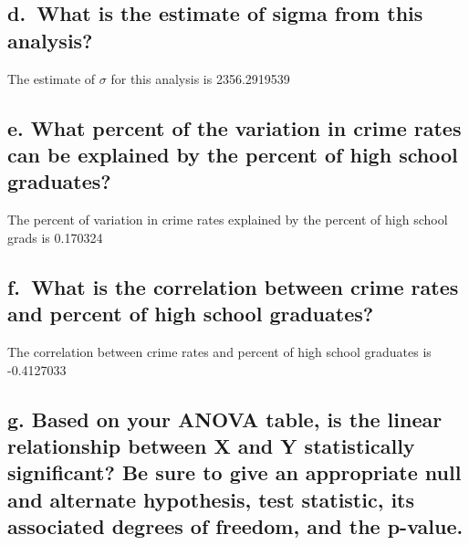 \documentclass[
]{article}
\begin{document}
\hypertarget{d.-what-is-the-estimate-of-sigma-from-this-analysis}{%
\subsection{d.~What is the estimate of sigma from this
analysis?}\label{d.-what-is-the-estimate-of-sigma-from-this-analysis}}

The estimate of \(\sigma\) for this analysis is 2356.2919539

\hypertarget{e.-what-percent-of-the-variation-in-crime-rates-can-be-explained-by-the-percent-of-high-school-graduates}{%
\subsection{e. What percent of the variation in crime rates can be
explained by the percent of high school
graduates?}\label{e.-what-percent-of-the-variation-in-crime-rates-can-be-explained-by-the-percent-of-high-school-graduates}}

The percent of variation in crime rates explained by the percent of high
school grads is 0.170324

\hypertarget{f.-what-is-the-correlation-between-crime-rates-and-percent-of-high-school-graduates}{%
\subsection{f.~What is the correlation between crime rates and percent
of high school
graduates?}\label{f.-what-is-the-correlation-between-crime-rates-and-percent-of-high-school-graduates}}

The correlation between crime rates and percent of high school graduates
is -0.4127033

\hypertarget{g.-based-on-your-anova-table-is-the-linear-relationship-between-x-and-y-statistically-significant-be-sure-to-give-an-appropriate-null-and-alternate-hypothesis-test-statistic-its-associated-degrees-of-freedom-and-the-p-value.}{%
\subsection{g. Based on your ANOVA table, is the linear relationship
between X and Y statistically significant? Be sure to give an
appropriate null and alternate hypothesis, test statistic, its
associated degrees of freedom, and the
p-value.}\label{g.-based-on-your-anova-table-is-the-linear-relationship-between-x-and-y-statistically-significant-be-sure-to-give-an-appropriate-null-and-alternate-hypothesis-test-statistic-its-associated-degrees-of-freedom-and-the-p-value.}}
\end{document}
